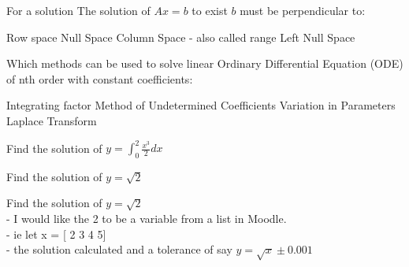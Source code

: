 \documentclass{exam}
\begin{document}
\begin{questions}


\question
For a solution The solution of $Ax=b$ to exist $b$ must be perpendicular to:
\begin{choices}
    \choice Row space
    \choice Null Space
    \choice Column Space - also called range
    \CorrectChoice Left Null Space
\end{choices}

\question
Which methods can be used to solve linear Ordinary Differential Equation (ODE) of nth order with constant coefficients:
\begin{choices}
    \choice Integrating factor
    \CorrectChoice Method of Undetermined Coefficients
    \CorrectChoice Variation in Parameters
    \CorrectChoice Laplace Transform
\end{choices}

\question Find the solution of $y=\int_0^2 \frac{x^3}{2} dx$


\question Find the solution of $y=\sqrt{2}$



\question Find the solution of $y=\sqrt{2}$\\
- I would like the 2 to be a variable from a list in Moodle.\\
- ie let x = [ 2 3 4 5]\\
- the solution calculated and a tolerance of say $y = \sqrt{x} \pm 0.001$



\end{questions}
\end{document}
